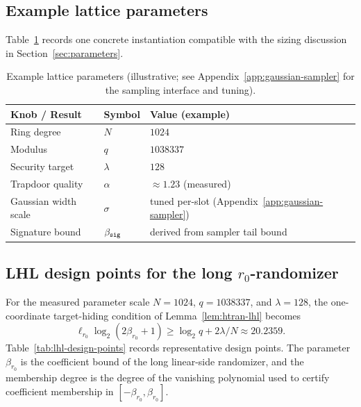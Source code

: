 \subsection{Example lattice parameters}
Table~\ref{tab:lattice-params} records one concrete instantiation compatible with the sizing discussion in
Section~\ref{sec:parameters}.

\begin{table}[H]
\centering
\renewcommand{\arraystretch}{1.15}
\begin{tabular}{@{}lll@{}}
\toprule
\textbf{Knob / Result} & \textbf{Symbol} & \textbf{Value (example)} \\
\midrule
Ring degree & \(N\) & \(1024\) \\
Modulus & \(q\) & \(1038337\) \\
Security target & \(\lambda\) & \(128\) \\
\midrule
Trapdoor quality & \(\alpha\) & \(\approx 1.23\) (measured) \\
Gaussian width scale & \(\sigma\) & tuned per-slot (Appendix~\ref{app:gaussian-sampler}) \\
Signature bound & \(\beta_{\mathtt{sig}}\) & derived from sampler tail bound \\
\bottomrule
\end{tabular}
\caption{Example lattice parameters (illustrative; see Appendix~\ref{app:gaussian-sampler} for the sampling interface and
tuning).}
\label{tab:lattice-params}
\end{table}

\subsection{LHL design points for the long $r_0$-randomizer}
For the measured parameter scale \(N=1024\), \(q=1038337\), and \(\lambda=128\), the one-coordinate target-hiding
condition of Lemma~\ref{lem:htran-lhl} becomes
\[
  \ell_{r_0}\log_2(2\beta_{r_0}+1)
  \ge
  \log_2 q + 2\lambda/N
  \approx 20.2359.
\]
Table~\ref{tab:lhl-design-points} records representative design points.  The parameter \(\beta_{r_0}\) is the
coefficient bound of the long linear-side randomizer, and the membership degree is the degree of the vanishing
polynomial used to certify coefficient membership in \([ -\beta_{r_0},\beta_{r_0}]\).

